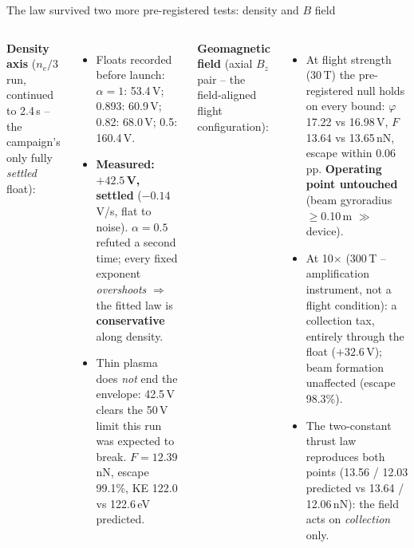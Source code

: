 \documentclass[10pt,aspectratio=169]{beamer}
\begin{document}
\begin{frame}{The law survived two more pre-registered tests: density and $B$ field}
  \begin{columns}
      \small\textbf{Density axis} ($n_e/3$ run, continued to 2.4\,\textmu s
      -- the campaign's only fully \emph{settled} float):
      \begin{itemize}\small
        \item Floats recorded before launch: $\alpha{=}1$: 53.4\,V;
              0.893: 60.9\,V; 0.82: 68.0\,V; 0.5: 160.4\,V.
        \item \textbf{Measured: $+42.5$\,V, settled}
              ($-0.14$\,V/\textmu s, flat to noise). $\alpha = 0.5$
              refuted a second time; every fixed exponent
              \emph{overshoots} $\Rightarrow$ the fitted law is
              \textbf{conservative} along density.
        \item Thin plasma does \emph{not} end the envelope: 42.5\,V clears
              the 50\,V limit this run was expected to break.
              $F = 12.39$\,nN, escape 99.1\%, KE 122.0 vs 122.6\,eV
              predicted.
      \end{itemize}
      \small\textbf{Geomagnetic field} (axial $B_z$ pair --
      the field-aligned flight configuration):
      \begin{itemize}\small
        \item At flight strength (30\,\textmu T) the pre-registered null
              holds on every bound: $\varphi$ 17.22 vs 16.98\,V,
              $F$ 13.64 vs 13.65\,nN, escape within 0.06\,pp.
              \textbf{Operating point untouched} (beam gyroradius
              $\ge$0.10\,m $\gg$ device).
        \item At 10$\times$ (300\,\textmu T -- amplification instrument,
              not a flight condition): a collection tax, entirely through
              the float ($+32.6$\,V); beam formation unaffected
              (escape 98.3\%).
        \item The two-constant thrust law reproduces both points
              (13.56 / 12.03 predicted vs 13.64 / 12.06\,nN): the field
              acts on \emph{collection} only.
      \end{itemize}
  \end{columns}
\end{frame}
\end{document}
